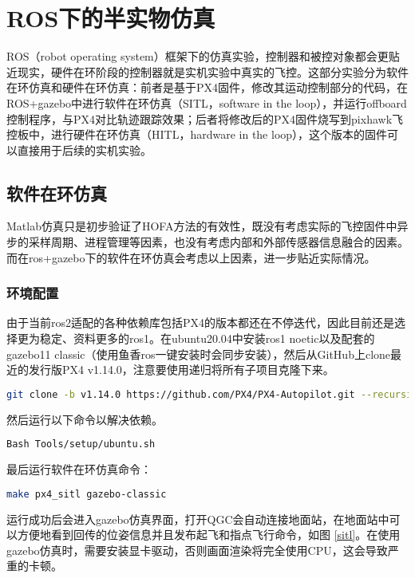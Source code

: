 \chapter{ROS下的半实物仿真}
ROS（robot operating system）框架下的仿真实验，控制器和被控对象都会更贴近现实，硬件在环阶段的控制器就是实机实验中真实的飞控。这部分实验分为软件在环仿真和硬件在环仿真：前者是基于PX4固件，修改其运动控制部分的代码，在ROS+gazebo中进行软件在环仿真（SITL，software in the loop），并运行offboard控制程序，与PX4对比轨迹跟踪效果；后者将修改后的PX4固件烧写到pixhawk飞控板中，进行硬件在环仿真（HITL，hardware in the loop），这个版本的固件可以直接用于后续的实机实验。
\section{软件在环仿真}
Matlab仿真只是初步验证了HOFA方法的有效性，既没有考虑实际的飞控固件中异步的采样周期、进程管理等因素，也没有考虑内部和外部传感器信息融合的因素。而在ros+gazebo下的软件在环仿真会考虑以上因素，进一步贴近实际情况。

\subsection{环境配置}
由于当前ros2适配的各种依赖库包括PX4的版本都还在不停迭代，因此目前还是选择更为稳定、资料更多的ros1。在ubuntu20.04中安装ros1 noetic以及配套的gazebo11 classic（使用鱼香ros一键安装\cite{fishros}时会同步安装），然后从GitHub上clone最近的发行版PX4 v1.14.0，注意要使用递归将所有子项目克隆下来。
\begin{lstlisting}[language=Bash, basicstyle=\footnotesize, linewidth=\linewidth]
  git clone -b v1.14.0 https://github.com/PX4/PX4-Autopilot.git --recursive
\end{lstlisting}

然后运行以下命令以解决依赖。

\begin{lstlisting}[language=Bash, basicstyle=\footnotesize, linewidth=\linewidth]
  Bash Tools/setup/ubuntu.sh
\end{lstlisting}

最后运行软件在环仿真命令：

\begin{lstlisting}[language=Bash, basicstyle=\footnotesize, linewidth=\linewidth]
  make px4_sitl gazebo-classic
\end{lstlisting}

运行成功后会进入gazebo仿真界面，打开QGC会自动连接地面站，在地面站中可以方便地看到回传的位姿信息并且发布起飞和指点飞行命令，如图 \ref{sitl}。在使用gazebo仿真时，需要安装显卡驱动，否则画面渲染将完全使用CPU，这会导致严重的卡顿。

